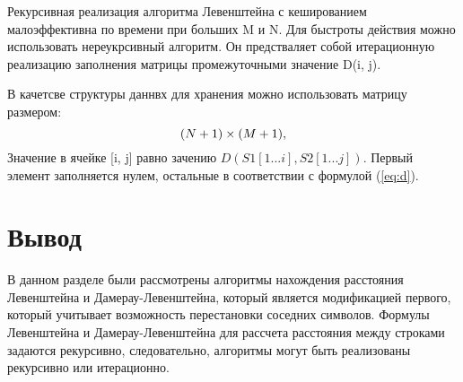 Рекурсивная реализация алгоритма Левенштейна с кешированием малоэффективна по времени при больших M и N. Для быстроты
действия можно использовать нереукрсивный алгоритм. Он предстваляет собой итерационную реализацию заполнения матрицы
промежуточными значение D(i, j).

В качетсве структуры даннвх для хранения можно использовать матрицу размером:
\begin{equation}
	(N + 1)\\\times(M + 1),
\end{equation}
    Значение в ячейке [i, j] равно зачению $D(S1[1...i], S2[1...j])$. Первый элемент заполняется нулем, остальные в 
    соответствии с формулой (\ref{eq:d}).



\section{Вывод}
В данном разделе были рассмотрены алгоритмы нахождения расстояния Левенштейна и Дамерау-Левенштейна, который является модификацией первого, который 
учитывает возможность перестановки соседних символов. Формулы Левенштейна и Дамерау-Левенштейна для рассчета расстояния между 
строками задаются рекурсивно, следовательно, алгоритмы могут быть реализованы рекурсивно или итерационно.
